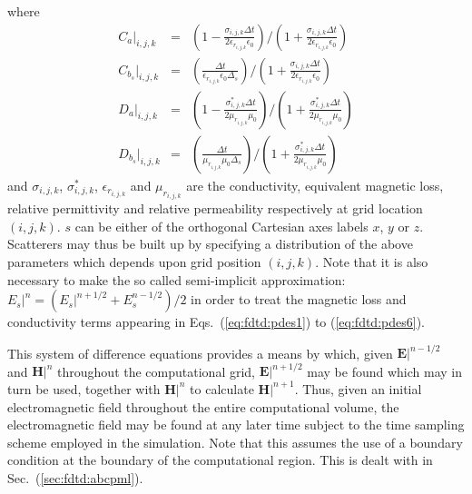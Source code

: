 \documentclass[a4paper, 12pt]{article}
\newcommand{\sect}[1]{Sec.\ (\ref{#1})}
\newcommand{\eqr}[2]{Eqs.\ (\ref{#1}) to (\ref{#2})}
\begin{document}
	where 
	\begin{eqnarray}
		\label{eq:fdtd:ca}
		C_{a}|_{i,j,k}&=&\left(1-\frac{\sigma_{i,j,k}\Delta
			t}{2\epsilon_{r_{i,j,k}}\epsilon_0}\right)/\left(1+\frac{\sigma_{i,j,k}\Delta
			t}{2\epsilon_{r_{i,j,k}}\epsilon_0}\right)\\
		\label{eq:fdtd:cb}
		C_{b_s}|_{i,j,k}&=&\left(\frac{\Delta t}{\epsilon_{r_{i,j,k}}\epsilon_0\Delta_s}\right)/\left(1+\frac{\sigma_{i,j,k}\Delta
			t}{2\epsilon_{r_{i,j,k}}\epsilon_0}\right)\\
		\label{eq:fdtd:da}
		D_{a}|_{i,j,k}&=&\left(1-\frac{\sigma^*_{i,j,k}\Delta
			t}{2\mu_{r_{i,j,k}}\mu_0}\right)/\left(1+\frac{\sigma^*_{i,j,k}\Delta
			t}{2\mu_{r_{i,j,k}}\mu_0}\right)\\
		\label{eq:fdtd:db}
		D_{b_s}|_{i,j,k}&=&\left(\frac{\Delta t}{\mu_{r_{i,j,k}}\mu_0\Delta_s}\right)/\left(1+\frac{\sigma^*_{i,j,k}\Delta
			t}{2\mu_{r_{i,j,k}}\mu_0}\right)
	\end{eqnarray}
	and $\sigma_{i,j,k}$, $\sigma^*_{i,j,k}$, $\epsilon_{r_{i,j,k}}$ and
	$\mu_{r_{i,j,k}}$ are the conductivity, equivalent magnetic loss,
	relative permittivity and relative permeability respectively at grid
	location $(i,j,k)$. $s$ can be either of the orthogonal Cartesian axes
	labels $x$, $y$ or $z$. Scatterers may thus be built up by specifying a
	distribution of the above parameters which depends upon grid position
	$(i,j,k)$. Note that it is also necessary to make the so called
	semi-implicit approximation: $E_s|^n=(E_s|^{n+1/2}+E_s^{n-1/2})/2$ in
	order to treat the magnetic loss and conductivity terms appearing in \eqr{eq:fdtd:pdes1}{eq:fdtd:pdes6}.
	
	This system of difference equations provides a means by which, given
	$\mathbf{E}|^{n-1/2}$ and $\mathbf{H}|^n$ throughout the computational
	grid, $\mathbf{E}|^{n+1/2}$ may be
	found which may in turn be used, together with $\mathbf{H}|^n$ to
	calculate $\mathbf{H}|^{n+1}$. Thus, given an initial electromagnetic
	field throughout the entire computational volume, the electromagnetic
	field may be found at any later time subject to the time sampling
	scheme employed in the simulation. Note that this assumes the use of a
	boundary condition at the boundary of the computational region. This
	is dealt with in \sect{sec:fdtd:abcpml}.
	
\end{document}
